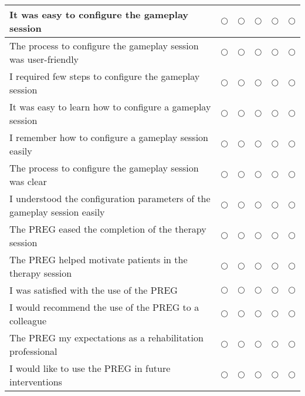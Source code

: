 \begin{longtable}{p{4.5cm}C{1.6cm}C{1.6cm}C{1.6cm}C{1.6cm}C{1.6cm}}
It was easy to configure the gameplay session & $\bigcirc$ & $\bigcirc$  & $\bigcirc$ & $\bigcirc$ & $\bigcirc$ \\\midrule
The process to configure the gameplay session was user-friendly & $\bigcirc$ & $\bigcirc$  & $\bigcirc$ & $\bigcirc$ & $\bigcirc$ \\\midrule
I required few steps to configure the gameplay session & $\bigcirc$ & $\bigcirc$  & $\bigcirc$ & $\bigcirc$ & $\bigcirc$ \\\midrule
It was easy to learn how to configure a gameplay session & $\bigcirc$ & $\bigcirc$  & $\bigcirc$ & $\bigcirc$ & $\bigcirc$ \\\midrule
I remember how to configure a gameplay session easily & $\bigcirc$ & $\bigcirc$  & $\bigcirc$ & $\bigcirc$ & $\bigcirc$ \\\midrule
The process to configure the gameplay session was clear & $\bigcirc$ & $\bigcirc$  & $\bigcirc$ & $\bigcirc$ & $\bigcirc$ \\\midrule
I understood the configuration parameters of the gameplay session easily & $\bigcirc$ & $\bigcirc$  & $\bigcirc$ & $\bigcirc$ & $\bigcirc$ \\\midrule
The \ac{PREG} eased the completion of the therapy session & $\bigcirc$ & $\bigcirc$  & $\bigcirc$ & $\bigcirc$ & $\bigcirc$ \\\midrule
The \ac{PREG} helped motivate patients in the therapy session & $\bigcirc$ & $\bigcirc$  & $\bigcirc$ & $\bigcirc$ & $\bigcirc$ \\\midrule
I was satisfied with the use of the \ac{PREG} & $\bigcirc$ & $\bigcirc$  & $\bigcirc$ & $\bigcirc$ & $\bigcirc$ \\\midrule
I would recommend the use of the \ac{PREG} to a colleague & $\bigcirc$ & $\bigcirc$  & $\bigcirc$ & $\bigcirc$ & $\bigcirc$ \\\midrule
The \ac{PREG} my expectations as a rehabilitation professional & $\bigcirc$ & $\bigcirc$  & $\bigcirc$ & $\bigcirc$ & $\bigcirc$ \\\midrule
I would like to use the \ac{PREG} in future interventions & $\bigcirc$ & $\bigcirc$  & $\bigcirc$ & $\bigcirc$ & $\bigcirc$ \\\midrule
\end{longtable}